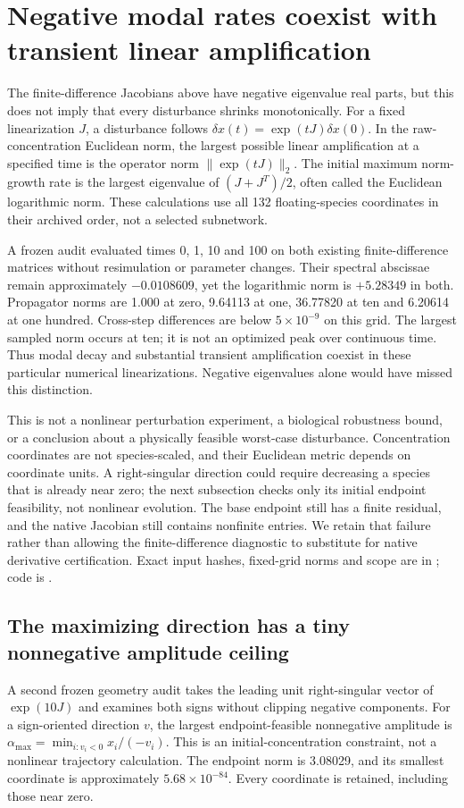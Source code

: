 \section{Negative modal rates coexist with transient linear amplification}
The finite-difference Jacobians above have negative eigenvalue real parts, but this does not imply that every disturbance shrinks monotonically. For a fixed linearization $J$, a disturbance follows $\delta x(t)=\exp(tJ)\delta x(0)$. In the raw-concentration Euclidean norm, the largest possible linear amplification at a specified time is the operator norm $\|\exp(tJ)\|_2$. The initial maximum norm-growth rate is the largest eigenvalue of $(J+J^T)/2$, often called the Euclidean logarithmic norm. These calculations use all 132 floating-species coordinates in their archived order, not a selected subnetwork.

A frozen audit evaluated times 0, 1, 10 and 100 on both existing finite-difference matrices without resimulation or parameter changes. Their spectral abscissae remain approximately $-0.0108609$, yet the logarithmic norm is $+5.28349$ in both. Propagator norms are 1.000 at zero, 9.64113 at one, 36.77820 at ten and 6.20614 at one hundred. Cross-step differences are below $5\times10^{-9}$ on this grid. The largest sampled norm occurs at ten; it is not an optimized peak over continuous time. Thus modal decay and substantial transient amplification coexist in these particular numerical linearizations. Negative eigenvalues alone would have missed this distinction.

This is not a nonlinear perturbation experiment, a biological robustness bound, or a conclusion about a physically feasible worst-case disturbance. Concentration coordinates are not species-scaled, and their Euclidean metric depends on coordinate units. A right-singular direction could require decreasing a species that is already near zero; the next subsection checks only its initial endpoint feasibility, not nonlinear evolution. The base endpoint still has a finite residual, and the native Jacobian still contains nonfinite entries. We retain that failure rather than allowing the finite-difference diagnostic to substitute for native derivative certification. Exact input hashes, fixed-grid norms and scope are in ; code is .

\subsection{The maximizing direction has a tiny nonnegative amplitude ceiling}
A second frozen geometry audit takes the leading unit right-singular vector of $\exp(10J)$ and examines both signs without clipping negative components. For a sign-oriented direction $v$, the largest endpoint-feasible nonnegative amplitude is $\alpha_{\max}=\min_{i:v_i<0}x_i/(-v_i)$. This is an initial-concentration constraint, not a nonlinear trajectory calculation. The endpoint norm is 3.08029, and its smallest coordinate is approximately $5.68\times10^{-84}$. Every coordinate is retained, including those near zero.

